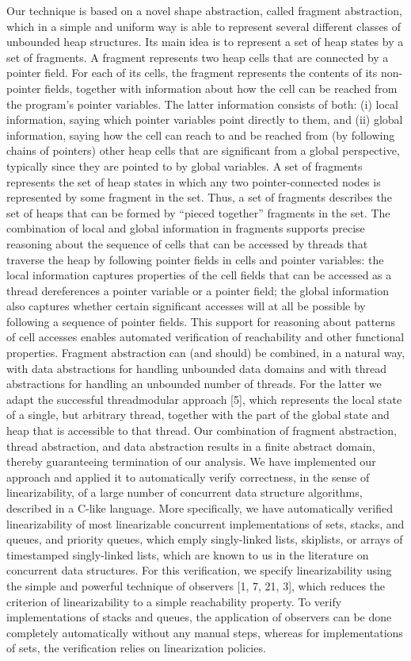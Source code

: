Our technique is based on a novel shape abstraction, called fragment abstraction,
which in a simple and uniform way is able to represent several different classes of
unbounded heap structures. Its main idea is to represent a set of heap states by a set
of fragments. A fragment represents two heap cells that are connected by a pointer
field. For each of its cells, the fragment represents the contents of its non-pointer fields,
together with information about how the cell can be reached from the program’s pointer
variables. The latter information consists of both: (i) local information, saying which
pointer variables point directly to them, and (ii) global information, saying how the cell
can reach to and be reached from (by following chains of pointers) other heap cells that
are significant from a global perspective, typically since they are pointed to by global
variables. A set of fragments represents the set of heap states in which any two pointer-connected nodes is represented by some fragment in the set. Thus, a set of fragments
describes the set of heaps that can be formed by “pieced together” fragments in the
set. The combination of local and global information in fragments supports precise
reasoning about the sequence of cells that can be accessed by threads that traverse the
heap by following pointer fields in cells and pointer variables: the local information
captures properties of the cell fields that can be accessed as a thread dereferences a
pointer variable or a pointer field; the global information also captures whether certain
significant accesses will at all be possible by following a sequence of pointer fields. This
support for reasoning about patterns of cell accesses enables automated verification of
reachability and other functional properties.
Fragment abstraction can (and should) be combined, in a natural way, with data abstractions for handling unbounded data domains and with thread abstractions for handling an unbounded number of threads. For the latter we adapt the successful threadmodular approach [5], which represents the local state of a single, but arbitrary thread,
together with the part of the global state and heap that is accessible to that thread. Our
combination of fragment abstraction, thread abstraction, and data abstraction results in
a finite abstract domain, thereby guaranteeing termination of our analysis.
We have implemented our approach and applied it to automatically verify correctness, in the sense of linearizability, of a large number of concurrent data structure
algorithms, described in a C-like language. More specifically, we have automatically
verified linearizability of most linearizable concurrent implementations of sets, stacks,
and queues, and priority queues, which emply singly-linked lists, skiplists, or arrays
of timestamped singly-linked lists, which are known to us in the literature on concurrent data structures. For this verification, we specify linearizability using the simple and
powerful technique of observers [1, 7, 21, 3], which reduces the criterion of linearizability to a simple reachability property. To verify implementations of stacks and queues,
the application of observers can be done completely automatically without any manual
steps, whereas for implementations of sets, the verification relies on linearization policies. 


